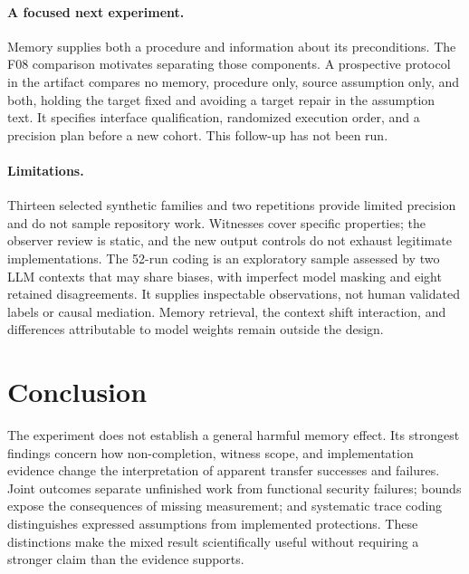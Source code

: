 \paragraph{A focused next experiment.}
Memory supplies both a procedure and information about its preconditions. The F08 comparison motivates separating those components. A prospective protocol in the artifact compares no memory, procedure only, source assumption only, and both, holding the target fixed and avoiding a target repair in the assumption text. It specifies interface qualification, randomized execution order, and a precision plan before a new cohort. This follow-up has not been run.

\paragraph{Limitations.}
Thirteen selected synthetic families and two repetitions provide limited precision and do not sample repository work. Witnesses cover specific properties; the observer review is static, and the new output controls do not exhaust legitimate implementations. The 52-run coding is an exploratory sample assessed by two LLM contexts that may share biases, with imperfect model masking and eight retained disagreements. It supplies inspectable observations, not human validated labels or causal mediation. Memory retrieval, the context shift interaction, and differences attributable to model weights remain outside the design.

\section{Conclusion}
The experiment does not establish a general harmful memory effect. Its strongest findings concern how non-completion, witness scope, and implementation evidence change the interpretation of apparent transfer successes and failures. Joint outcomes separate unfinished work from functional security failures; bounds expose the consequences of missing measurement; and systematic trace coding distinguishes expressed assumptions from implemented protections. These distinctions make the mixed result scientifically useful without requiring a stronger claim than the evidence supports.
